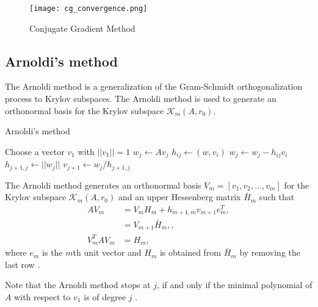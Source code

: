 \begin{figure}[H]
  \centering
  \texttt{[image: cg\_convergence.png]}
  \caption{Conjugate Gradient Method}
  \label{fig:cg}
\end{figure}

\subsection{Arnoldi's method} \label{sec:arnoldi}
The Arnoldi method is a generalization of the Gram-Schmidt orthogonalization process to Krylov subspaces. The Arnoldi method is used to generate an orthonormal basis for the Krylov subspace $\mathcal{K}_m(A, r_0)$.
\begin{algorithm}[H]
  \caption{Arnoldi's method \cite[Algorithm 6.1]{iter_method_saad}}
  \begin{algorithmic}
    \State Choose a vector $v_1$ with $||v_1|| = 1$
    \State $w_j \leftarrow Av_j$
    \State $h_{ij} \leftarrow (w, v_i)$
    \State $w_j \leftarrow w_j - h_{ij}v_i$
    \EndFor
    \State $h_{j+1,j} \leftarrow ||w_j||$
    \State $v_{j+1} \leftarrow w_j / h_{j+1,j}$
    \EndFor
  \end{algorithmic}
  \label{alg:arnoldi}
\end{algorithm}
The Arnoldi method generates an orthonormal basis $V_m = [v_1, v_2, \dots, v_m]$ for the Krylov subspace $\mathcal{K}_m(A, r_0)$ and an upper Hessenberg matrix $\bar{H}_m$ such that
\begin{subequations}\label{eq:arnoldi_decomposition}
  \begin{align}
    AV_m      & = V_m H_m + h_{m+1,m}v_{m+1}e_m^T \label{eqn:arnoldi_decomposition0}, \\
              & = V_{m+1}\bar{H}_m, \label{eqn:arnoldi_decomposition1},               \\
    V^T_mAV_m & = H_m, \label{eqn:arnoldi_decomposition2}
  \end{align}
\end{subequations}
where $e_m$ is the $m$th unit vector and $H_m$ is obtained from $\bar{H}_m$ by removing the last row \cite[Proposition 6.5]{iter_method_saad}.

Note that the Arnoldi method stops at $j$, if and only if the minimal polynomial of $A$ with respect to $v_1$ is of degree $j$ \cite[proposition 6.6]{iter_method_saad}.

